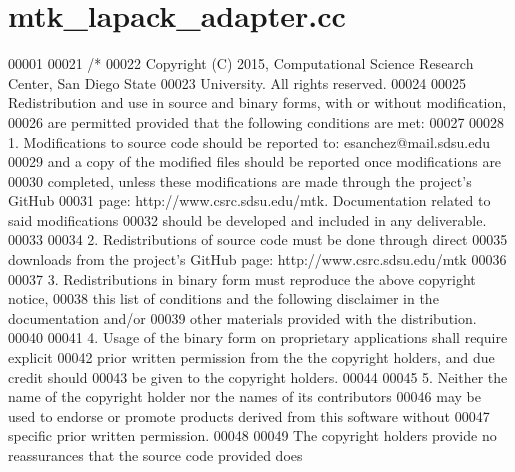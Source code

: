 \hypertarget{mtk__lapack__adapter_8cc_source}{\section{mtk\+\_\+lapack\+\_\+adapter.\+cc}
\label{mtk__lapack__adapter_8cc_source}
}

\begin{DoxyCode}
00001 
00021 \textcolor{comment}{/*}
00022 \textcolor{comment}{Copyright (C) 2015, Computational Science Research Center, San Diego State}
00023 \textcolor{comment}{University. All rights reserved.}
00024 \textcolor{comment}{}
00025 \textcolor{comment}{Redistribution and use in source and binary forms, with or without modification,}
00026 \textcolor{comment}{are permitted provided that the following conditions are met:}
00027 \textcolor{comment}{}
00028 \textcolor{comment}{1. Modifications to source code should be reported to: esanchez@mail.sdsu.edu}
00029 \textcolor{comment}{and a copy of the modified files should be reported once modifications are}
00030 \textcolor{comment}{completed, unless these modifications are made through the project's GitHub}
00031 \textcolor{comment}{page: http://www.csrc.sdsu.edu/mtk. Documentation related to said modifications}
00032 \textcolor{comment}{should be developed and included in any deliverable.}
00033 \textcolor{comment}{}
00034 \textcolor{comment}{2. Redistributions of source code must be done through direct}
00035 \textcolor{comment}{downloads from the project's GitHub page: http://www.csrc.sdsu.edu/mtk}
00036 \textcolor{comment}{}
00037 \textcolor{comment}{3. Redistributions in binary form must reproduce the above copyright notice,}
00038 \textcolor{comment}{this list of conditions and the following disclaimer in the documentation and/or}
00039 \textcolor{comment}{other materials provided with the distribution.}
00040 \textcolor{comment}{}
00041 \textcolor{comment}{4. Usage of the binary form on proprietary applications shall require explicit}
00042 \textcolor{comment}{prior written permission from the the copyright holders, and due credit should}
00043 \textcolor{comment}{be given to the copyright holders.}
00044 \textcolor{comment}{}
00045 \textcolor{comment}{5. Neither the name of the copyright holder nor the names of its contributors}
00046 \textcolor{comment}{may be used to endorse or promote products derived from this software without}
00047 \textcolor{comment}{specific prior written permission.}
00048 \textcolor{comment}{}
00049 \textcolor{comment}{The copyright holders provide no reassurances that the source code provided does}

\end{DoxyCode}

